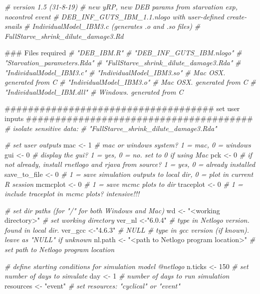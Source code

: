 \documentclass[10,portrait]{article}
\newenvironment{Shaded}{\begin{snugshade}}{\end{snugshade}}
\newcommand{\DecValTok}[1]{\textcolor[rgb]{0.00,0.00,0.81}{#1}}
\newcommand{\StringTok}[1]{\textcolor[rgb]{0.31,0.60,0.02}{#1}}
\newcommand{\CommentTok}[1]{\textcolor[rgb]{0.56,0.35,0.01}{\textit{#1}}}
\newcommand{\NormalTok}[1]{#1}
\begin{document}
\begin{Shaded}
\begin{Highlighting}[]
\CommentTok{# version 1.5 (31-8-19)}
\CommentTok{# new yRP, new DEB params from starvation exp, nocontrol event}
\CommentTok{# DEB_INF_GUTS_IBM_1.1.nlogo with user-defined create-snails}
\CommentTok{# IndividualModel_IBM3.c (generates .o and .so files)  }
\CommentTok{# FullStarve_shrink_dilute_damage3.Rd}

\NormalTok{### Files required  }
\CommentTok{# "DEB_IBM.R"}
\CommentTok{# "DEB_INF_GUTS_IBM.nlogo"}
\CommentTok{# "Starvation_parameters.Rda"}
\CommentTok{# "FullStarve_shrink_dilute_damage3.Rda"}
\CommentTok{# "IndividualModel_IBM3.c"}
\CommentTok{# "IndividualModel_IBM3.so" # Mac OSX. generated from C}
\CommentTok{# "IndividualModel_IBM3.o" # Mac OSX. generated from C  }
\CommentTok{# "IndividualModel_IBM.dll" # Windows. generated from C   }

\NormalTok{####################################  set user inputs ####################################### }
\CommentTok{# isolate sensitive data:}
\CommentTok{# "FullStarve_shrink_dilute_damage3.Rda"}

\CommentTok{# set user outputs}
\NormalTok{mac <-}\StringTok{ }\DecValTok{1} \CommentTok{# mac or windows system? 1 = mac, 0 = windows }
\NormalTok{gui <-}\StringTok{ }\DecValTok{0} \CommentTok{# display the gui? 1 = yes, 0 = no. set to 0 if using Mac}
\NormalTok{pck <-}\StringTok{ }\DecValTok{0} \CommentTok{# if not already, install rnetlogo and rjava from source? 1 = yes, 0 = already installed }
\NormalTok{save_to_file <-}\StringTok{ }\DecValTok{0} \CommentTok{# 1 = save simulation outputs to local dir, 0 = plot in current R session}
\NormalTok{mcmcplot <-}\StringTok{ }\DecValTok{0} \CommentTok{# 1 = save mcmc plots to dir}
\NormalTok{traceplot <-}\StringTok{ }\DecValTok{0} \CommentTok{# 1 = include traceplot in mcmc plots? intensive!!!}

\CommentTok{# set dir paths (for "/" for both Windows and Mac)}
\NormalTok{  wd <-}\StringTok{ "<working directory>"} \CommentTok{# set working directory  }
\NormalTok{  ver_nl <-}\StringTok{"6.0.4"} \CommentTok{# type in Netlogo version. found in local dir. }
\NormalTok{  ver_gcc <-}\StringTok{"4.6.3"} \CommentTok{# NULL # type in gcc version (if known). leave as "NULL" if unknown   }
\NormalTok{  nl.path <-}\StringTok{ "<path to Netlogo program location>"} \CommentTok{# set path to Netlogo program location}

\CommentTok{# define starting conditions for simulation model @netlogo}
\NormalTok{n.ticks <-}\StringTok{ }\DecValTok{150} \CommentTok{# set number of days to simulate}
\NormalTok{day <-}\StringTok{ }\DecValTok{1} \CommentTok{# number of days to run simulation  }
\NormalTok{resources <-}\StringTok{ "event"} \CommentTok{# set resources: "cyclical" or "event"}


\end{Highlighting}
\end{Shaded}
\end{document}
